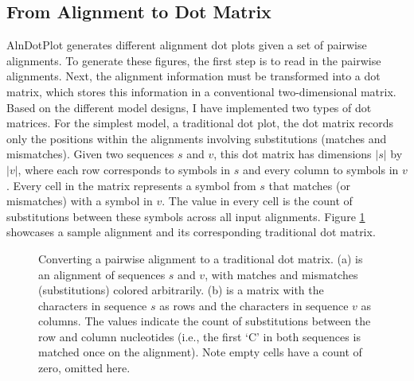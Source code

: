 \subsection{From Alignment to Dot Matrix}

AlnDotPlot generates different alignment dot plots given a set of pairwise alignments. To generate these figures, the first step is to read in the pairwise alignments. Next, the alignment information must be transformed into a dot matrix, which stores this information in a conventional two-dimensional matrix. Based on the different model designs, I have implemented two types of dot matrices. For the simplest model, a traditional dot plot, the dot matrix records only the positions within the alignments involving substitutions (matches and mismatches).
Given two sequences $s$ and $v$, this dot matrix has dimensions $|s|$ by $|v|$, where each row corresponds to symbols in $s$ and every column to symbols in $v$. Every cell in the matrix represents a symbol from $s$ that matches (or mismatches) with a symbol in $v$. The value in every cell is the count of substitutions between these symbols across all input alignments. Figure \ref{fig:aln2matrix-traditional} showcases a sample alignment and its corresponding traditional dot matrix.

\begin{figure}[!ht]
    \centering
    \begin{subfigure}[c]{0.4\textwidth}
        \centering
        \vspace*{-7em}
        \vspace*{1.5em}\caption{}
     \end{subfigure}
     \hspace{0.3em}
    \begin{subfigure}[b]{0.4\textwidth}
        \centering
        
        \caption{}
     \end{subfigure}

    \caption[Alignment to Traditional Dot Matrix]{Converting a pairwise alignment to a traditional dot matrix. (a) is an alignment of sequences $s$ and $v$, with matches and mismatches (substitutions) colored arbitrarily. (b) is a matrix with the characters in sequence $s$ as rows and the characters in sequence $v$ as columns. The values indicate the count of substitutions between the row and column nucleotides (i.e., the first `C' in both sequences is matched once on the alignment). Note empty cells have a count of zero, omitted here.}
    \label{fig:aln2matrix-traditional}
\end{figure}

